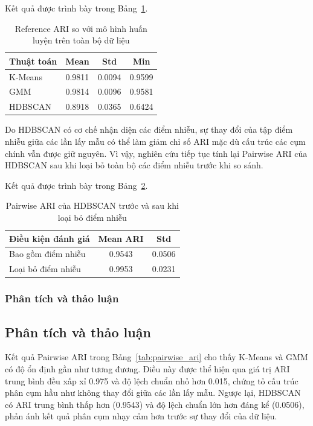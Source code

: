 \documentclass[12pt]{ai_conquer2026}
\begin{document}
Kết quả được trình bày trong Bảng~\ref{tab:reference_ari}.

\begin{table}[H]
\centering
\caption{Reference ARI so với mô hình huấn luyện trên toàn bộ dữ liệu}
\label{tab:reference_ari}
\renewcommand{\arraystretch}{1.2}
\begin{tabular}{lccc}
\toprule
\textbf{Thuật toán} &
\textbf{Mean} &
\textbf{Std} &
\textbf{Min} \\
\midrule
K-Means & 0.9811 & 0.0094 & 0.9599\\
GMM & 0.9814 & 0.0096 & 0.9581\\
HDBSCAN & 0.8918 & 0.0365 & 0.6424\\
\bottomrule
\end{tabular}
\end{table}

Do HDBSCAN có cơ chế nhận diện các điểm nhiễu, sự thay đổi của tập điểm nhiễu giữa các lần lấy mẫu có thể làm giảm chỉ số ARI mặc dù cấu trúc các cụm chính vẫn được giữ nguyên. Vì vậy, nghiên cứu tiếp tục tính lại Pairwise ARI của HDBSCAN sau khi loại bỏ toàn bộ các điểm nhiễu trước khi so sánh.

Kết quả được trình bày trong Bảng~\ref{tab:hdbscan_noise}.

\begin{table}[H]
\centering
\caption{Pairwise ARI của HDBSCAN trước và sau khi loại bỏ điểm nhiễu}
\label{tab:hdbscan_noise}
\renewcommand{\arraystretch}{1.2}
\begin{tabular}{lcc}
\toprule
\textbf{Điều kiện đánh giá} &
\textbf{Mean ARI} &
\textbf{Std} \\
\midrule
Bao gồm điểm nhiễu & 0.9543 & 0.0506\\
Loại bỏ điểm nhiễu & 0.9953 & 0.0231\\
\bottomrule
\end{tabular}
\end{table}

\subsubsection{Phân tích và thảo luận}

\subsection{Phân tích và thảo luận}

Kết quả Pairwise ARI trong Bảng~\ref{tab:pairwise_ari} cho thấy K-Means và GMM có độ ổn định gần như tương đương. Điều này được thể hiện qua giá trị ARI trung bình đều xấp xỉ 0.975 và độ lệch chuẩn nhỏ hơn 0.015, chứng tỏ cấu trúc phân cụm hầu như không thay đổi giữa các lần lấy mẫu. Ngược lại, HDBSCAN có ARI trung bình thấp hơn (0.9543) và độ lệch chuẩn lớn hơn đáng kể (0.0506), phản ánh kết quả phân cụm nhạy cảm hơn trước sự thay đổi của dữ liệu.
\end{document}
